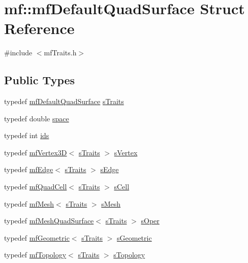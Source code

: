 \hypertarget{structmf_1_1mfDefaultQuadSurface}{
\section{mf::mfDefaultQuadSurface Struct Reference}
\label{structmf_1_1mfDefaultQuadSurface}
}


{\ttfamily \#include $<$mfTraits.h$>$}

\subsection*{Public Types}
\begin{DoxyCompactItemize}
\item 
typedef \hyperlink{structmf_1_1mfDefaultQuadSurface}{mfDefaultQuadSurface} \hyperlink{structmf_1_1mfDefaultQuadSurface_ae66261c5d476e4f08c76bd95613146f8}{sTraits}
\item 
typedef double \hyperlink{structmf_1_1mfDefaultQuadSurface_a8068e0e3bd65f3104214374571b5c477}{space}
\item 
typedef int \hyperlink{structmf_1_1mfDefaultQuadSurface_af8fa333aced6c7736f6409852c3f013f}{ids}
\item 
typedef \hyperlink{classmf_1_1mfVertex3D}{mfVertex3D}$<$ \hyperlink{structmf_1_1mfDefaultQuadSurface}{sTraits} $>$ \hyperlink{structmf_1_1mfDefaultQuadSurface_a13e7f334dafe64651870e1a03b746038}{sVertex}
\item 
typedef \hyperlink{classmf_1_1mfEdge}{mfEdge}$<$ \hyperlink{structmf_1_1mfDefaultQuadSurface}{sTraits} $>$ \hyperlink{structmf_1_1mfDefaultQuadSurface_a7f1595081909265e8f53222c0fe7bc96}{sEdge}
\item 
typedef \hyperlink{classmf_1_1mfQuadCell}{mfQuadCell}$<$ \hyperlink{structmf_1_1mfDefaultQuadSurface}{sTraits} $>$ \hyperlink{structmf_1_1mfDefaultQuadSurface_aa4285fd8b26df0d7042c3412c587c069}{sCell}
\item 
typedef \hyperlink{classmf_1_1mfMesh}{mfMesh}$<$ \hyperlink{structmf_1_1mfDefaultQuadSurface}{sTraits} $>$ \hyperlink{structmf_1_1mfDefaultQuadSurface_ae1ec7d23c26e764a2f3f48d5b55853a1}{sMesh}
\item 
typedef \hyperlink{classmf_1_1mfMeshQuadSurface}{mfMeshQuadSurface}$<$ \hyperlink{structmf_1_1mfDefaultQuadSurface}{sTraits} $>$ \hyperlink{structmf_1_1mfDefaultQuadSurface_a8127d8ebc79269fd47ae392b3a41c76e}{sOper}
\item 
typedef \hyperlink{classmf_1_1mfGeometric}{mfGeometric}$<$ \hyperlink{structmf_1_1mfDefaultQuadSurface}{sTraits} $>$ \hyperlink{structmf_1_1mfDefaultQuadSurface_a61318df86637b442010db8e044f08f18}{sGeometric}
\item 
typedef \hyperlink{classmf_1_1mfTopology}{mfTopology}$<$ \hyperlink{structmf_1_1mfDefaultQuadSurface}{sTraits} $>$ \hyperlink{structmf_1_1mfDefaultQuadSurface_a333e0d3288d81acd9f542e42452fad78}{sTopology}
\end{DoxyCompactItemize}


